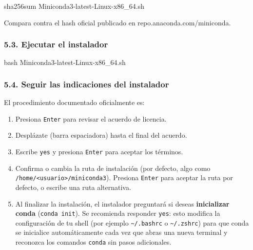 \documentclass[
  doc,
  floatsintext,
  longtable,
  a4paper,
  nolmodern,
  notxfonts,
  notimes,
  12pt,
  colorlinks=true,linkcolor=blue,citecolor=blue,urlcolor=blue]{apa7}
\newenvironment{Shaded}{\begin{snugshade}}{\end{snugshade}}
\newcommand{\FunctionTok}[1]{\textcolor[rgb]{0.28,0.35,0.67}{#1}}
\newcommand{\NormalTok}[1]{\textcolor[rgb]{0.00,0.23,0.31}{#1}}
\providecommand{\tightlist}{%
  \setlength{\itemsep}{0pt}\setlength{\parskip}{0pt}}
\begin{document}
\begin{Shaded}
\begin{Highlighting}[]
\FunctionTok{sha256sum}\NormalTok{ Miniconda3{-}latest{-}Linux{-}x86\_64.sh}
\end{Highlighting}
\end{Shaded}

Compara contra el hash oficial publicado en repo.anaconda.com/miniconda.

\subsubsection{5.3. Ejecutar el
instalador}\label{ejecutar-el-instalador}

\begin{Shaded}
\begin{Highlighting}[]
\FunctionTok{bash}\NormalTok{ Miniconda3{-}latest{-}Linux{-}x86\_64.sh}
\end{Highlighting}
\end{Shaded}

\subsubsection{5.4. Seguir las indicaciones del
instalador}\label{seguir-las-indicaciones-del-instalador}

El procedimiento documentado oficialmente es:

\begin{enumerate}
\def\labelenumi{\arabic{enumi}.}
\tightlist
\item
  Presiona \texttt{Enter} para revisar el acuerdo de licencia.
\item
  Desplázate (barra espaciadora) hasta el final del acuerdo.
\item
  Escribe \texttt{yes} y presiona \texttt{Enter} para aceptar los
  términos.
\item
  Confirma o cambia la ruta de instalación (por defecto, algo como
  \texttt{/home/\textless{}usuario\textgreater{}/miniconda3}). Presiona
  \texttt{Enter} para aceptar la ruta por defecto, o escribe una ruta
  alternativa.
\item
  Al finalizar la instalación, el instalador preguntará si deseas
  \textbf{inicializar conda} (\texttt{conda\ init}). Se recomienda
  responder \texttt{yes}: esto modifica la configuración de tu shell
  (por ejemplo \texttt{\textasciitilde{}/.bashrc} o
  \texttt{\textasciitilde{}/.zshrc}) para que conda se inicialice
  automáticamente cada vez que abras una nueva terminal y reconozca los
  comandos \texttt{conda} sin pasos adicionales.
\end{enumerate}
\end{document}
